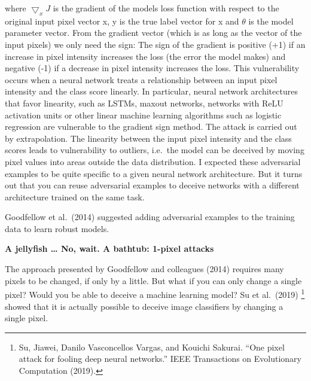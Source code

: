 \documentclass[
  11pt,
]{scrbook}
\begin{document}
where \(\bigtriangledown_x{}J\) is the gradient of the models loss function with respect to the original input pixel vector x, y is the true label vector for x and \(\theta\) is the model parameter vector.
From the gradient vector (which is as long as the vector of the input pixels) we only need the sign:
The sign of the gradient is positive (+1) if an increase in pixel intensity increases the loss (the error the model makes) and negative (-1) if a decrease in pixel intensity increases the loss.
This vulnerability occurs when a neural network treats a relationship between an input pixel intensity and the class score linearly.
In particular, neural network architectures that favor linearity, such as LSTMs, maxout networks, networks with ReLU activation units or other linear machine learning algorithms such as logistic regression are vulnerable to the gradient sign method.
The attack is carried out by extrapolation.
The linearity between the input pixel intensity and the class scores leads to vulnerability to outliers, i.e.~the model can be deceived by moving pixel values into areas outside the data distribution.
I expected these adversarial examples to be quite specific to a given neural network architecture.
But it turns out that you can reuse adversarial examples to deceive networks with a different architecture trained on the same task.

Goodfellow et al.~(2014) suggested adding adversarial examples to the training data to learn robust models.

\textbf{A jellyfish \ldots{} No, wait. A bathtub: 1-pixel attacks}

The approach presented by Goodfellow and colleagues (2014) requires many pixels to be changed, if only by a little.
But what if you can only change a single pixel?
Would you be able to deceive a machine learning model?
Su et al.~(2019) \footnote{Su, Jiawei, Danilo Vasconcellos Vargas, and Kouichi Sakurai. ``One pixel attack for fooling deep neural networks.'' IEEE Transactions on Evolutionary Computation (2019).} showed that it is actually possible to deceive image classifiers by changing a single pixel.
\end{document}
